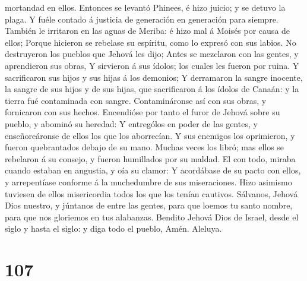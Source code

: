 mortandad en ellos.  Entonces se levantó Phinees, é hizo
juicio; y se detuvo la plaga.  Y fuéle contado á justicia
de generación en generación para siempre.  También le
irritaron en las aguas de Meriba: é hizo mal á Moisés por causa de
ellos;  Porque hicieron se rebelase su espíritu, como lo
expresó con sus labios.  No destruyeron los pueblos que
Jehová les dijo;  Antes se mezclaron con las gentes, y
aprendieron sus obras,  Y sirvieron á sus ídolos; los
cuales les fueron por ruina.  Y sacrificaron sus hijos y
sus hijas á los demonios;  Y derramaron la sangre inocente,
la sangre de sus hijos y de sus hijas, que sacrificaron á los ídolos de
Canaán: y la tierra fué contaminada con sangre. 
Contamináronse así con sus obras, y fornicaron con sus hechos.
 Encendióse por tanto el furor de Jehová sobre su pueblo, y
abominó su heredad:  Y entrególos en poder de las gentes, y
enseñoreáronse de ellos los que los aborrecían.  Y sus
enemigos los oprimieron, y fueron quebrantados debajo de su mano.
 Muchas veces los libró; mas ellos se rebelaron á su
consejo, y fueron humillados por su maldad.  El con todo,
miraba cuando estaban en angustia, y oía su clamor:  Y
acordábase de su pacto con ellos, y arrepentíase conforme á la
muchedumbre de sus miseraciones.  Hizo asimismo tuviesen de
ellos misericordia todos los que los tenían cautivos. 
Sálvanos, Jehová Dios nuestro, y júntanos de entre las gentes, para que
loemos tu santo nombre, para que nos gloriemos en tus alabanzas.
 Bendito Jehová Dios de Israel, desde el siglo y hasta el
siglo: y diga todo el pueblo, Amén. Aleluya.

\hypertarget{section-106}{%
\section{107}\label{section-106}}

